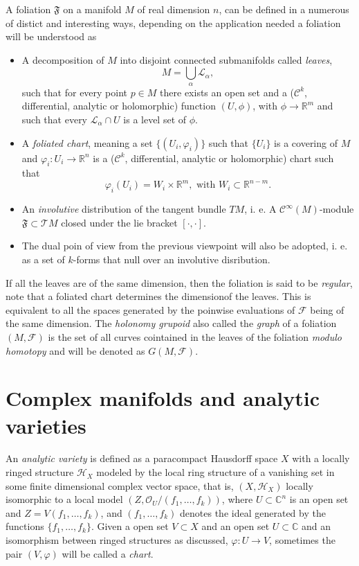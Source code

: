 \documentclass[12pt,twoside,a4paper]{report}
\newcommand{\co}{\ensuremath{\mathbb C }}
\newcommand{\con}{\ensuremath{\mathbb{C}^n}}
\newcommand{\re}{\ensuremath{\mathbb R }}
\begin{document}
A foliation $\mathfrak{F}$ on a manifold $M$ of real dimension $n$, can be defined in a numerous of distict and interesting ways, depending on the application needed a foliation will be understood as
\begin{itemize}
  \item A decomposition of $M$ into disjoint connected submanifolds called \emph{leaves},
        \[
          M=\bigcup_{\alpha}\mathcal{L_{\alpha}},
        \]
        \noindent such that for every point $p\in M$ there exists an open set and a ($\mathcal{C}^{k}$, differential, analytic or holomorphic) function $(U,\phi)$, with $\phi\rightarrow\re^{m}$ and such that every $\mathcal{L}_{\alpha}\cap U$ is a level set of $\phi$.
  \item A \emph{foliated chart}, meaning a set $\{(U_{i},\varphi_{i})\}$ such that $\{U_{i}\}$ is a covering of $M$ and $\varphi_{i}:U_{i}\rightarrow\re^{n}$ is a ($\mathcal{C}^{k}$, differential, analytic or holomorphic) chart such that
        \[
          \varphi_{i}(U_{i})=W_{i}\times\re^{m},\text{ with }W_{i}\subset\re^{n-m}.
        \]
  \item An \emph{involutive} distribution of the tangent bundle $TM$, i. e. A $\mathcal{C}^{\infty}(M)$-module $\mathfrak{F}\subset\mathcal{T}M$ closed under the lie bracket $[\cdot,\cdot]$.
  \item The dual poin of view from the previous viewpoint will also be adopted, i. e. as a set of $k$-forms that null over an involutive disribution.
\end{itemize}
If all the leaves are of the same dimension, then the foliation is said to be \emph{regular}, note that a foliated chart determines the dimensionof the leaves. This is equivalent to all the spaces generated by the poinwise evaluations of $\mathcal{F}$ being of the same dimension.
The \emph{holonomy grupoid} also called the \emph{graph} of a foliation $(M,\mathcal{F})$ is the set of all curves cointained in the leaves of the foliation \textit{modulo homotopy} and will be denoted as $G(M,\mathcal{F})$.

\section{Complex manifolds and analytic varieties}
An \emph{analytic variety} is defined as a paracompact Hausdorff space $X$ with a locally ringed structure $\mathcal{H}_{X}$ modeled by the local ring structure of
a vanishing set in some finite dimensional complex vector space, that is, $(X,\mathcal{H}_{X})$ locally isomorphic to a local model $(Z,\mathcal{O}_{U}/(f_{1},\dots,f_{k}))$, where $U\subset\con$ is an open set and $Z=V(f_{1},\dots,f_{k})$, and $(f_{1},\dots,f_{k})$ denotes the ideal generated by the functions $\{f_{1},\dots,f_{k}\}$. Given a open set $V\subset X$ and an open set $U\subset\co$ and an isomorphism between ringed structures as discussed, $\varphi:U\rightarrow V$, sometimes the pair $(V,\varphi)$ will be called a \emph{chart}.
\end{document}

